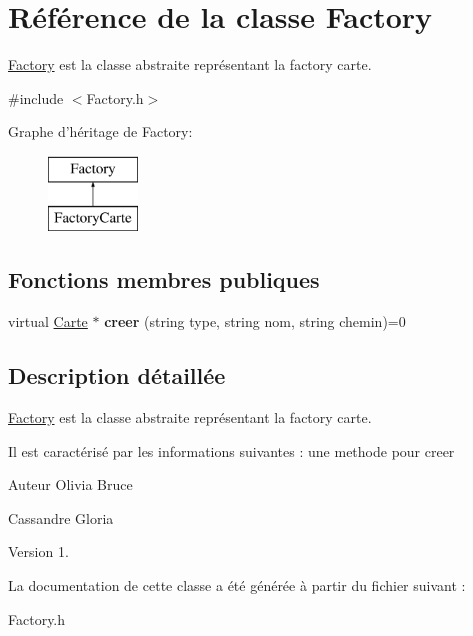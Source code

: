 \hypertarget{classFactory}{\section{\-Référence de la classe \-Factory}
\label{classFactory}
}


\hyperlink{classFactory}{\-Factory} est la classe abstraite représentant la factory carte.  




{\ttfamily \#include $<$\-Factory.\-h$>$}

\-Graphe d'héritage de \-Factory\-:\begin{figure}[H]
\begin{center}
\leavevmode
\includegraphics[height=2.000000cm]{classFactory}
\end{center}
\end{figure}
\subsection*{\-Fonctions membres publiques}
\begin{DoxyCompactItemize}
\item 
\hypertarget{classFactory_abf45c3c8d63f070a1bb90865c9678197}{virtual \hyperlink{classCarte}{\-Carte} $\ast$ {\bfseries creer} (string type, string nom, string chemin)=0}\label{classFactory_abf45c3c8d63f070a1bb90865c9678197}

\end{DoxyCompactItemize}


\subsection{\-Description détaillée}
\hyperlink{classFactory}{\-Factory} est la classe abstraite représentant la factory carte. 

\-Il est caractérisé par les informations suivantes \-: une methode pour creer

\begin{DoxyAuthor}{\-Auteur}
\-Olivia \-Bruce 

\-Cassandre \-Gloria 
\end{DoxyAuthor}
\begin{DoxyVersion}{\-Version}
1. 
\end{DoxyVersion}


\-La documentation de cette classe a été générée à partir du fichier suivant \-:\begin{DoxyCompactItemize}
\item 
\-Factory.\-h\end{DoxyCompactItemize}
